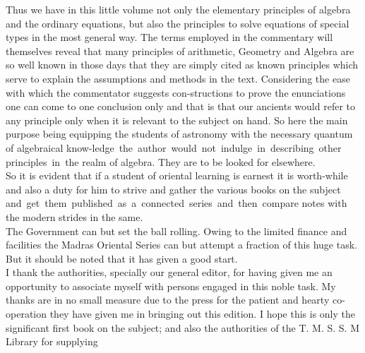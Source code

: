 \documentclass[11pt, openany]{book}
\begin{document}
{\englishfont Thus we have in this little volume not only the 
elementary principles of algebra and the ordinary
equations, but also the principles to solve equations of 
special types in the most general way. The terms
employed in the commentary will themselves reveal that
many principles of arithmetic, Geometry and Algebra are
so well known in those days that they are simply cited
as known principles which serve to explain the assumptions and methods in the text. Considering the ease
with which the commentator suggests con-structions to
prove the enunciations one can come to one conclusion
only and that is that our ancients would refer to any
principle only when it is relevant to the subject on
hand. So here the main purpose being equipping the
students of astronomy with the necessary quantum of
algebraical know-ledge \,the \,author \,would \,not \,indulge \,in\, describing \,other \,principles \,in \,the realm of algebra. They
are to be looked for elsewhere.\\

\vspace{-3mm}
 So it is evident that if a student of oriental
learning is earnest it is worth-while and also a duty
for him to strive and gather the various books on the
subject \,and \,get \,them \,published \,as \,a \,connected \,series \,and \,then \,compare notes with the modern strides in
the same.\\

\vspace{-3mm}
 The Government can but set the ball rolling. Owing
to the limited finance and facilities the Madras Oriental Series can but attempt a fraction of this huge task. But
it should be noted that it has given a good start.\\

\vspace{-3mm}
 I thank the authorities, specially our general editor,
for having given me an opportunity to associate myself with persons engaged in this noble task. My thanks
are in no small measure due to the press for the patient 
and hearty co-operation they have given me in
bringing out this edition.  I hope this is only the 
significant first book on the subject;  and also the 
authorities of the T. M. S. S. M Library for supplying}
\newpage
\end{document}
